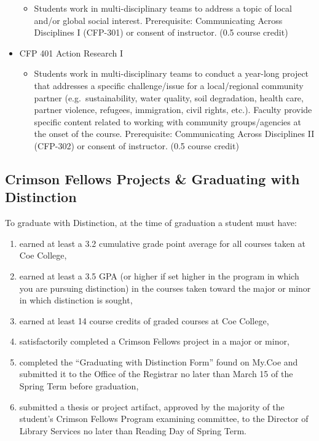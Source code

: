 \documentclass[
  letterpaper,
]{scrbook}
\providecommand{\tightlist}{%
  \setlength{\itemsep}{0pt}\setlength{\parskip}{0pt}}
\begin{document}
\begin{itemize}
  \begin{itemize}
  \tightlist
  \item
    Students work in multi-disciplinary teams to address a topic of
    local and/or global social interest. Prerequisite: Communicating
    Across Disciplines I (CFP-301) or consent of instructor. (0.5 course
    credit)
  \end{itemize}
\item
  CFP 401 Action Research I

  \begin{itemize}
  \tightlist
  \item
    Students work in multi-disciplinary teams to conduct a year-long
    project that addresses a specific challenge/issue for a
    local/regional community partner (e.g.~sustainability, water
    quality, soil degradation, health care, partner violence, refugees,
    immigration, civil rights, etc.). Faculty provide specific content
    related to working with community groups/agencies at the onset of
    the course. Prerequisite: Communicating Across Disciplines II
    (CFP-302) or consent of instructor. (0.5 course credit)
  \end{itemize}
\end{itemize}

\subsection{Crimson Fellows Projects \& Graduating with
Distinction}\label{crimson-fellows-projects-graduating-with-distinction}

To graduate with Distinction, at the time of graduation a student must
have:

\begin{enumerate}
\def\labelenumi{\arabic{enumi}.}
\tightlist
\item
  earned at least a 3.2 cumulative grade point average for all courses
  taken at Coe College,
\item
  earned at least a 3.5 GPA (or higher if set higher in the program in
  which you are pursuing distinction) in the courses taken toward the
  major or minor in which distinction is sought,
\item
  earned at least 14 course credits of graded courses at Coe College,
\item
  satisfactorily completed a Crimson Fellows project in a major or
  minor,
\item
  completed the ``Graduating with Distinction Form'' found on My.Coe and
  submitted it to the Office of the Registrar no later than March 15 of
  the Spring Term before graduation,
\item
  submitted a thesis or project artifact, approved by the majority of
  the student's Crimson Fellows Program examining committee, to the
  Director of Library Services no later than Reading Day of Spring Term.
\end{enumerate}
\end{document}
